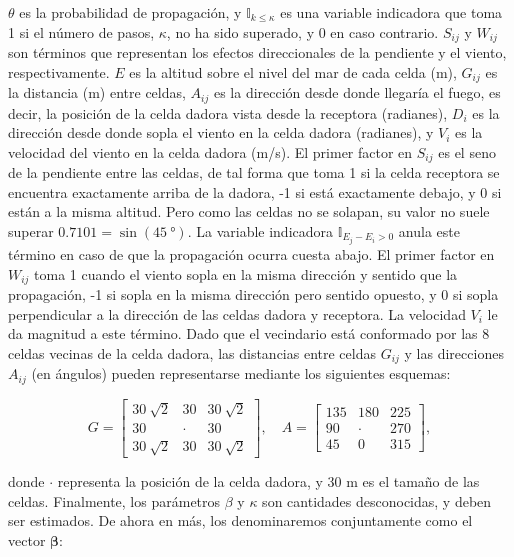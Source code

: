 \noindent $\theta$ es la probabilidad de propagación, y $\mathbb{I}_{k \le \kappa}$ es una variable indicadora que toma 1 si el número de pasos, $\kappa$, no ha sido superado, y 0 en caso contrario. $S_{ij}$ y $W_{ij}$ son términos que representan los efectos direccionales de la pendiente y el viento, respectivamente. $E$ es la altitud sobre el nivel del mar de cada celda (m), $G_{ij}$ es la distancia (m) entre celdas, $A_{ij}$ es la dirección desde donde llegaría el fuego, es decir, la posición de la celda dadora vista desde la receptora (radianes), $D_i$ es la dirección desde donde sopla el viento en la celda dadora (radianes), y $V_i$ es la velocidad del viento en la celda dadora (m/s). El primer factor en $S_{ij}$ es el seno de la pendiente entre las celdas, de tal forma que toma 1 si la celda receptora se encuentra exactamente arriba de la dadora, -1 si está exactamente debajo, y 0 si están a la misma altitud. Pero como las celdas no se solapan, su valor no suele superar $0.7101 = \sin{(45\ \text{°})}$. La variable indicadora $\mathbb{I}_{E_j - E_i > 0}$ anula este término en caso de que la propagación ocurra cuesta abajo. El primer factor en $W_{ij}$ toma 1 cuando el viento sopla en la misma dirección y sentido que la propagación, -1 si sopla en la misma dirección pero sentido opuesto, y 0 si sopla perpendicular a la dirección de las celdas dadora y receptora. La velocidad $V_i$ le da magnitud a este término. Dado que el vecindario está conformado por las 8 celdas vecinas de la celda dadora, las distancias entre celdas $G_{ij}$ y las direcciones $A_{ij}$ (en ángulos) pueden representarse mediante los siguientes esquemas:

\[
    G =
    \begin{bmatrix}
        30 \ \sqrt{2} & 30 & 30 \ \sqrt{2} \\
        30 & \cdot & 30 \\
        30 \ \sqrt{2} & 30 & 30 \ \sqrt{2}
    \end{bmatrix}, \quad
    A =
    \begin{bmatrix}
        135 & 180 & 225 \\
        90 & \cdot & 270 \\
        45 & 0 & 315
    \end{bmatrix},
\]

\noindent donde $\cdot$ representa la posición de la celda dadora, y 30 m es el tamaño de las celdas. Finalmente, los parámetros $\beta$ y $\kappa$ son cantidades desconocidas, y deben ser estimados. De ahora en más, los denominaremos conjuntamente como el vector $\boldsymbol{\beta}$:

